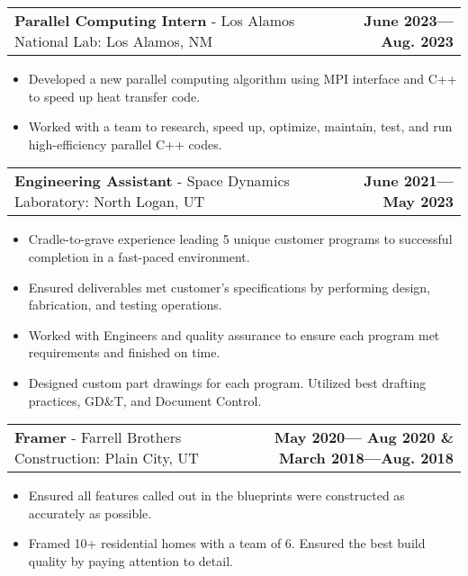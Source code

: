 \documentclass[letterpaper,11pt]{article}
\makeatletter
\newcommand{\resumeExpSubheading}[4]{
  \vspace{-3pt}\item
    \begin{tabular*}{1.0\textwidth}[t]{l@{\extracolsep{\fill}}r}
      \textbf{#1} - \normalsize#2: \small #3 & \textbf{\small #4}
    \end{tabular*}\vspace{-9pt}
}
\newcommand{\resumeItemListStart}{\begin{itemize}}
\newcommand{\resumeItemListEnd}{\end{itemize}\vspace{-5pt}}
\newcommand{\resumeItem}[1]{ 
  \item\small{
    {#1 \vspace{-4pt}}
  }
}
\makeatother
\begin{document}
    \resumeExpSubheading{Parallel Computing Intern}{Los Alamos National Lab}{Los Alamos, NM}{June 2023—Aug. 2023}   %
    \resumeItemListStart{}
        \resumeItem{Developed a new parallel computing algorithm using MPI interface and C++ to speed up heat transfer code.}
        \resumeItem{Worked with a team to research, speed up, optimize, maintain, test, and run high-efficiency parallel C++ codes.}
    \resumeItemListEnd{}
    
    \resumeExpSubheading{Engineering Assistant}{Space Dynamics Laboratory}{North Logan, UT}{June 2021—May 2023}  %
    \resumeItemListStart{}
        \resumeItem{Cradle-to-grave experience leading 5 unique customer programs to successful completion in a fast-paced environment.}
        \resumeItem{Ensured deliverables met customer's specifications by performing design, fabrication, and testing operations.}
        \resumeItem{Worked with Engineers and quality assurance to ensure each program met requirements and finished on time. }
        \resumeItem{Designed custom part drawings for each program. Utilized best drafting practices, GD\&T, and Document Control.}
    \resumeItemListEnd{}
    
    \resumeExpSubheading{Framer}{Farrell Brothers Construction}{ Plain City, UT}{May 2020— Aug 2020 \& March 2018—Aug. 2018}  %
      \resumeItemListStart{}
        \resumeItem{Ensured all features called out in the blueprints were constructed as accurately as possible. }
        \resumeItem{Framed 10+ residential homes with a team of 6. Ensured the best build quality by paying attention to detail.}
    \resumeItemListEnd{}
\end{document}
